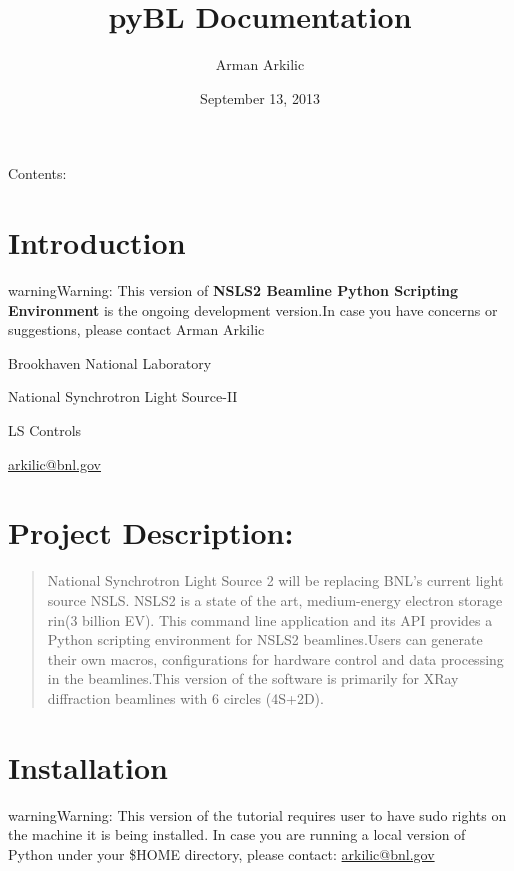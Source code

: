 \documentclass[letterpaper,10pt,english]{sphinxmanual}
\title{pyBL Documentation}
\date{September 13, 2013}
\author{Arman Arkilic}
\begin{document}
\maketitle
\tableofcontents
{}\label{index::doc}


Contents:


\chapter{Introduction}
\label{Introduction:introduction}\label{Introduction:welcome-to-pybl-s-documentation}\label{Introduction::doc}
\begin{notice}{warning}{Warning:}
This version of \textbf{NSLS2 Beamline Python Scripting Environment} is the ongoing development version.In case you have concerns or suggestions, please contact
Arman Arkilic

Brookhaven National Laboratory

National Synchrotron Light Source-II

LS Controls

\href{mailto:arkilic@bnl.gov}{arkilic@bnl.gov}
\end{notice}


\chapter{Project Description:}
\label{Introduction:project-description}\begin{quote}

National Synchrotron Light Source 2 will be replacing BNL's current light source NSLS. NSLS2 is a state of the art, medium-energy electron storage rin(3 billion EV). This command line application and its API provides a Python scripting environment for NSLS2 beamlines.Users can generate their own macros, configurations for hardware control and data processing in the beamlines.This version of the software is primarily for XRay diffraction beamlines with 6 circles (4S+2D).
\end{quote}


\chapter{Installation}
\label{Installation:installation}\label{Installation::doc}
\begin{notice}{warning}{Warning:}
This version of the tutorial requires user to have sudo rights on the machine it is being installed. In case you are running a local version of Python under your \$HOME directory, please contact: \href{mailto:arkilic@bnl.gov}{arkilic@bnl.gov}
\end{notice}
\end{document}
